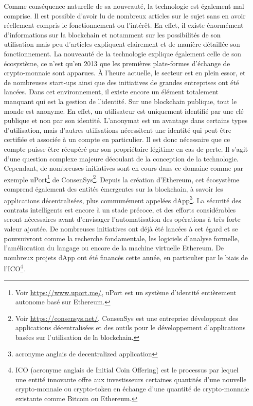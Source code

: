 \documentclass{tnreport}
\begin{document}
Comme conséquence naturelle de sa nouveauté, la technologie est également mal comprise.
Il est possible d'avoir lu de nombreux articles sur le sujet sans en avoir réellement compris le fonctionnement ou l'intérêt.
En effet, il existe énormément d'informations sur la blockchain et notamment sur les possibilités de son utilisation mais peu d'articles expliquent clairement et de manière détaillée son fonctionnement.
La nouveauté de la technologie explique également celle de son écosystème, ce n'est qu'en 2013 que les premières plate-formes d'échange de crypto-monnaie sont apparues.
À l'heure actuelle, le secteur est en plein essor, et de nombreuses start-ups ainsi que des initiatives de grandes entreprises ont été lancées.
Dans cet environnement, il existe encore un élément totalement manquant qui est la gestion de l'identité.
Sur une blockchain publique, tout le monde est anonyme. En effet, un utilisateur est uniquement identifié par une clé publique et non par son identité.
L'anonymat est un avantage dans certains types d'utilisation, mais d'autres utilisations nécessitent une identité qui peut être certifiée et associée à un compte en particulier. Il est donc nécessaire que ce compte puisse être récupéré par son propriétaire légitime en cas de perte.
Il s'agit d'une question complexe majeure découlant de la conception de la technologie. Cependant, de nombreuses initiatives sont en cours dans ce domaine comme par exemple uPort\footnote{Voir \url{https://www.uport.me/}, uPort est un système d'identité entièrement autonome basé sur Ethereum.} de ConsenSys\footnote{Voir \url{https://consensys.net/}, ConsenSys est une entreprise développant des applications décentralisées et des outils pour le développement d'applications basées sur l'utilisation de la blockchain.}.
Depuis la création d'Ethereum, cet écosystème comprend également des entités émergentes sur la blockchain, à savoir les applications décentralisées, plus communément appelées dApp\footnote{acronyme anglais de decentralized application}.
La sécurité des contrats intelligents est encore à un stade précoce, et des efforts considérables seront nécessaires avant d'envisager l'automatisation des opérations à très forte valeur ajoutée.
De nombreuses initiatives ont déjà été lancées à cet égard et se poursuivront comme la recherche fondamentale, les logiciels d'analyse formelle, l'amélioration du langage ou encore de la machine virtuelle Ethereum.
De nombreux projets dApp ont été financés cette année, en particulier par le biais de l'ICO\footnote{
ICO (acronyme anglais de Initial Coin Offering) est le processus par lequel une entité innovante offre aux investisseurs certaines quantités d'une nouvelle crypto-monnaie ou crypto-token en échange d'une quantité de crypto-monnaie existante comme Bitcoin ou Ethereum.}.
\end{document}
